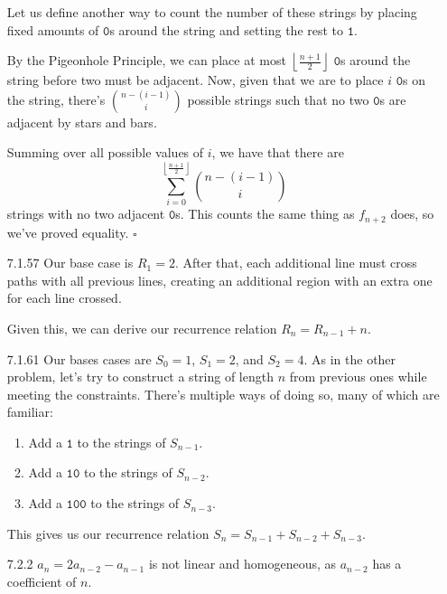 \documentclass[12pt]{article}
\begin{document}
\begin{enumerate}
        Let us define another way to count the number of these strings by
        placing fixed amounts of $\texttt{0}$s around the string and setting the rest to $\texttt{1}$.

        By the Pigeonhole Principle, we can place at most $\left\lfloor\frac{n+1}{2}\right\rfloor$ $\texttt{0}$s
        around the string before two must be adjacent.
        Now, given that we are to place $i$ $\texttt{0}$s on the string, there's $\binom{n-(i-1)}{i}$
        possible strings such that no two $\texttt{0}$s are adjacent by stars and bars.

        Summing over all possible values of $i$, we have that there are
        \[\sum_{i=0}^{\left\lfloor\frac{n+1}{2}\right\rfloor} \binom{n-(i-1)}{i}\]
        strings with no two adjacent $\texttt{0}$s.
        This counts the same thing as $f_{n+2}$ does, so we've proved equality. $\square$
    \item[7.1.57] Our base case is $R_1=2$.
        After that, each additional line must cross paths with all previous lines, creating an additional
        region with an extra one for each line crossed.

        Given this, we can derive our recurrence relation $R_n=R_{n-1}+n$.
    \item[7.1.61] Our bases cases are $S_0=1$, $S_1=2$, and $S_2=4$.
        As in the other problem, let's try to construct a string of length $n$ from previous ones
        while meeting the constraints.
        There's multiple ways of doing so, many of which are familiar:
        \begin{enumerate}[label=\arabic*]
            \item Add a $\texttt{1}$ to the strings of $S_{n-1}$.
            \item Add a $\texttt{10}$ to the strings of $S_{n-2}$.
            \item Add a $\texttt{100}$ to the strings of $S_{n-3}$.
        \end{enumerate}
        This gives us our recurrence relation $S_n=S_{n-1}+S_{n-2}+S_{n-3}$.
    \item[7.2.2] $a_n=2a_{n-2}-a_{n-1}$ is not linear and homogeneous, as $a_{n-2}$ has a coefficient of $n$.
\end{enumerate}

\pagebreak
\end{document}
